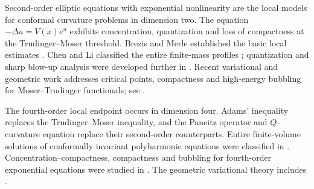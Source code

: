 \documentclass[11pt]{article}
\numberwithin{equation}{section}
\begin{document}
Second-order elliptic equations with exponential nonlinearity are the local
models for conformal curvature problems in dimension two. The equation
\(-\Delta u=V(x)e^{u}\) exhibits concentration, quantization and loss of
compactness at the Trudinger--Moser threshold. Brezis and Merle established the
basic local estimates \cite{BrezisMerle}. Chen and Li classified the entire
finite-mass profiles \cite{ChenLi}; quantization and sharp blow-up analysis were
developed further in \cite{LiShafrir,AdimurthiDruet}. Recent variational and
geometric work addresses critical points, compactness and high-energy bubbling
for Moser--Trudinger functionals; see
\cite{DeMarchisMalchiodiMartinazziThizy,MalchiodiMartinazziThizy}.

The fourth-order local endpoint occurs in dimension four. Adams' inequality
\cite{Adams} replaces the Trudinger--Moser inequality, and the Paneitz operator
and \(Q\)-curvature equation replace their second-order counterparts. Entire
finite-volume solutions of conformally invariant polyharmonic equations were
classified in \cite{Lin,WeiXu,Martinazzi}. Concentration--compactness,
compactness and bubbling for fourth-order exponential equations were studied
in \cite{MartinazziCC,DruetRobert,LinWeiFourthOrder,MalchiodiCompactness}.
The geometric variational theory includes
\cite{ChangYang,DjadliMalchiodi,MalchiodiStruwe}.
\end{document}
